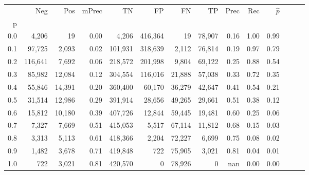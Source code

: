 \begin{tabular}{rrrrrrrrrrrrrr}
\toprule
{} &      Neg &     Pos & mPrec &       TN &       FP &      FN &      TP &  Prec &   Rec & $\hat{p}$ \\
p   &          &         &       &          &          &         &         &       &       &           \\
\midrule
0.0 &    4,206 &      19 &  0.00 &    4,206 &  416,364 &      19 &  78,907 &  0.16 &  1.00 &      0.99 \\
0.1 &   97,725 &   2,093 &  0.02 &  101,931 &  318,639 &   2,112 &  76,814 &  0.19 &  0.97 &      0.79 \\
0.2 &  116,641 &   7,692 &  0.06 &  218,572 &  201,998 &   9,804 &  69,122 &  0.25 &  0.88 &      0.54 \\
0.3 &   85,982 &  12,084 &  0.12 &  304,554 &  116,016 &  21,888 &  57,038 &  0.33 &  0.72 &      0.35 \\
0.4 &   55,846 &  14,391 &  0.20 &  360,400 &   60,170 &  36,279 &  42,647 &  0.41 &  0.54 &      0.21 \\
0.5 &   31,514 &  12,986 &  0.29 &  391,914 &   28,656 &  49,265 &  29,661 &  0.51 &  0.38 &      0.12 \\
0.6 &   15,812 &  10,180 &  0.39 &  407,726 &   12,844 &  59,445 &  19,481 &  0.60 &  0.25 &      0.06 \\
0.7 &    7,327 &   7,669 &  0.51 &  415,053 &    5,517 &  67,114 &  11,812 &  0.68 &  0.15 &      0.03 \\
0.8 &    3,313 &   5,113 &  0.61 &  418,366 &    2,204 &  72,227 &   6,699 &  0.75 &  0.08 &      0.02 \\
0.9 &    1,482 &   3,678 &  0.71 &  419,848 &      722 &  75,905 &   3,021 &  0.81 &  0.04 &      0.01 \\
1.0 &      722 &   3,021 &  0.81 &  420,570 &        0 &  78,926 &       0 &   nan &  0.00 &      0.00 \\
\bottomrule
\end{tabular}
